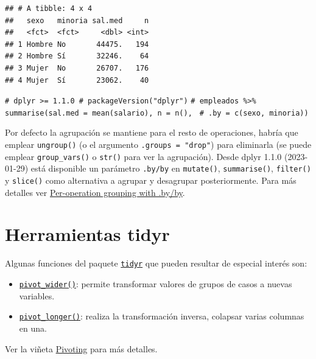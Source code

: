\documentclass[
]{book}
\newenvironment{Shaded}{\begin{snugshade}}{\end{snugshade}}
\newcommand{\CommentTok}[1]{\textcolor[rgb]{0.56,0.35,0.01}{\textit{#1}}}
\providecommand{\tightlist}{%
  \setlength{\itemsep}{0pt}\setlength{\parskip}{0pt}}
\theoremstyle{break}
\theoremstyle{nonumberplain}
\renewcommand{\CommentTok}[1]{\textcolor[rgb]{0.41,0.41,0.41}{\texttt{#1}}}
\begin{document}
\begin{verbatim}
## # A tibble: 4 x 4
##   sexo   minoria sal.med     n
##   <fct>  <fct>     <dbl> <int>
## 1 Hombre No       44475.   194
## 2 Hombre Sí       32246.    64
## 3 Mujer  No       26707.   176
## 4 Mujer  Sí       23062.    40
\end{verbatim}

\begin{Shaded}
\begin{Highlighting}[]
\CommentTok{\# dplyr \textgreater{}= 1.1.0 \# packageVersion("dplyr")}
\CommentTok{\# empleados \%\textgreater{}\% summarise(sal.med = mean(salario), n = n(), }
\CommentTok{\#                         .by = c(sexo, minoria))}
\end{Highlighting}
\end{Shaded}

Por defecto la agrupación se mantiene para el resto de operaciones, habría que emplear \texttt{ungroup()} (o el argumento \texttt{.groups\ =\ "drop"}) para eliminarla (se puede emplear \texttt{group\_vars()} o \texttt{str()} para ver la agrupación).
Desde dplyr 1.1.0 (2023-01-29) está disponible un parámetro \texttt{.by/by} en \texttt{mutate()}, \texttt{summarise()}, \texttt{filter()} y \texttt{slice()} como alternativa a agrupar y desagrupar posteriormente.
Para más detalles ver \href{https://dplyr.tidyverse.org/reference/dplyr_by.html}{Per-operation grouping with .by/by}.

\section{Herramientas tidyr}\label{herramientas-tidyr}

Algunas funciones del paquete \href{https://tidyr.tidyverse.org}{\texttt{tidyr}} que pueden resultar de especial interés son:

\begin{itemize}
\tightlist
\item
  \href{https://tidyr.tidyverse.org/reference/pivot_wider.html}{\texttt{pivot\_wider()}}: permite transformar valores de grupos de casos a nuevas variables.
\item
  \href{https://tidyr.tidyverse.org/reference/pivot_longer.html}{\texttt{pivot\_longer()}}: realiza la transformación inversa, colapsar varias columnas en una.
\end{itemize}

Ver la viñeta \href{https://tidyr.tidyverse.org/articles/pivot.html}{Pivoting} para más detalles.
\end{document}

